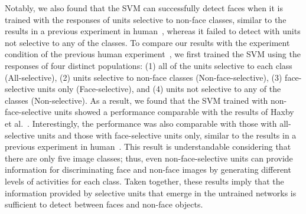 \documentclass[final,3p,times,twocolumn]{elsarticle}
\begin{document}
Notably, we also found that the SVM can successfully detect faces when it is trained with the responses of units selective to non-face classes, 
similar to the results in a previous experiment in human~\cite{haxby2001distributed},
whereas it failed to detect with units not selective to any of the classes.
To compare our results with the experiment condition of the previous human experiment~\cite{haxby2001distributed},
we first trained the SVM using the responses of four distinct populations:
(1) all of the units selective to each class (All-selective),
(2) units selective to non-face classes (Non-face-selective),
(3) face-selective units only (Face-selective),
and (4) units not selective to any of the classes (Non-selective).
As a result, we found that the SVM trained with non-face-selective units showed a performance comparable with the results of Haxby et al.~\cite{haxby2001distributed}.
Interestingly, the performance was also comparable with those with all-selective units and those with face-selective units only,
similar to the results in a previous experiment in human~\cite{haxby2001distributed}.
This result is understandable considering that there are only five image classes;
thus, even non-face-selective units can provide information for discriminating face and non-face images by generating different levels of activities for each class.
Taken together, these results imply that the information provided by selective units that emerge in the untrained networks is sufficient to detect between faces and non-face objects.
\end{document}
